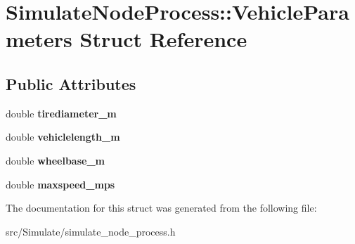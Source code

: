 \hypertarget{structSimulateNodeProcess_1_1VehicleParameters}{}\section{Simulate\+Node\+Process\+:\+:Vehicle\+Parameters Struct Reference}
\label{structSimulateNodeProcess_1_1VehicleParameters}
\subsection*{Public Attributes}
\begin{DoxyCompactItemize}
\item 
\mbox{\label{structSimulateNodeProcess_1_1VehicleParameters_a671811a1c374ce61ebfece594374afa5}} 
double {\bfseries tirediameter\+\_\+m}
\item 
\mbox{\label{structSimulateNodeProcess_1_1VehicleParameters_a650dc053b6e15f09eb34f2c7b8cf41fa}} 
double {\bfseries vehiclelength\+\_\+m}
\item 
\mbox{\label{structSimulateNodeProcess_1_1VehicleParameters_a1d5b6a244ef348470c6b538efbaa8a76}} 
double {\bfseries wheelbase\+\_\+m}
\item 
\mbox{\label{structSimulateNodeProcess_1_1VehicleParameters_a780ead4a26635e7a11b00274c5e859a1}} 
double {\bfseries maxspeed\+\_\+mps}
\end{DoxyCompactItemize}


The documentation for this struct was generated from the following file\+:\begin{DoxyCompactItemize}
\item 
src/\+Simulate/simulate\+\_\+node\+\_\+process.\+h\end{DoxyCompactItemize}
